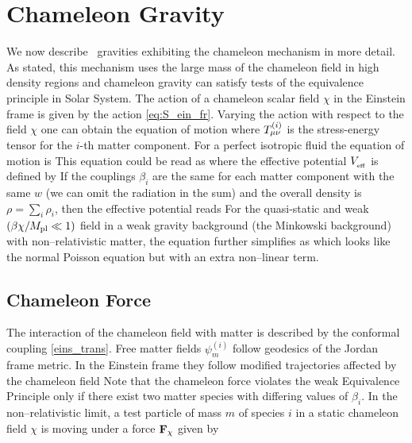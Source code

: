 \section{Chameleon Gravity}
\label{sec_cham}
We now describe \fR\ gravities exhibiting the chameleon mechanism in more detail. As stated, this mechanism uses the large mass of the chameleon field in high density regions and chameleon gravity can satisfy tests of the equivalence principle in Solar System. The action of a chameleon scalar field $\chi$ in the Einstein frame is given by the action \eqref{eq:S_ein_fr}. Varying the action with respect to the field $\chi$ one can obtain the equation of motion
where $T^{(i)}_{\mu\nu}$ is the stress-energy tensor for the $i$-th matter component. For a perfect isotropic fluid the equation of motion is
This equation could be read as
where the effective potential $V_{_\text{\tiny eff}}$ is defined by
If the couplings $\beta_i$ are the same for each matter component with the same $w$ (we can omit the radiation in the sum) and the overall density is $\rho=\sum_i\rho_i$, then the effective potential reads
For the quasi-static and weak $(\beta\chi/M_{\text{\scriptsize pl}}\ll1)$ field in a weak gravity background (the Minkowski background) with non--relativistic matter, the equation further simplifies as
which looks like the normal Poisson equation but with an extra non--linear term.
\subsection{Chameleon Force}
The interaction of the chameleon field with matter is described by the conformal coupling \eqref{eins_trans}. Free matter fields $\psi_m^{(i)}$ follow geodesics of the Jordan frame metric. In the Einstein frame they follow modified trajectories affected by the chameleon field \parencite{Waterhouse:2006wv}
Note that the chameleon force violates the weak Equivalence Principle only if there exist two matter species with differing values of $\beta_i$. In the non--relativistic limit, a test particle of mass $m$ of species $i$ in a static chameleon field $\chi$ is moving under a force $\mathbf{F}_\chi$ given by
